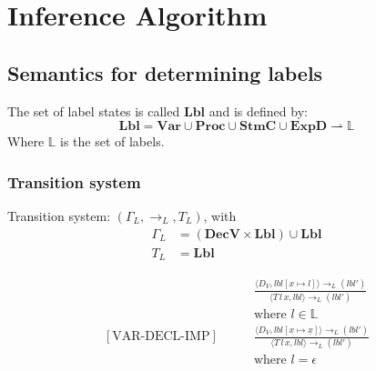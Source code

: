 
\newcommand{\iVar}{\mathbf{Var}}
\newcommand{\iProc}{\mathbf{Proc}}
\newcommand{\iDecv}{\mathbf{DecV}}
\newcommand{\iDecp}{\mathbf{DecP}}
\newcommand{\iStmc}{\mathbf{StmC}}
\newcommand{\iExpd}{\mathbf{ExpD}}
\newcommand{\iLbl}{\mathbf{Lbl}}

\newcommand{\trtspc}{\hspace{2em}} %

\section{Inference Algorithm}

\subsection{Semantics for determining labels}
The set of label states is called $\iLbl$ and is defined by:
\[
  \iLbl = \iVar \cup \iProc \cup \iStmc \cup \iExpd \rightharpoonup \mathbb{L}
\]
Where $\mathbb{L}$ is the set of labels.

\subsubsection{Transition system}
Transition system: $(\Gamma_L, \rightarrow_L, T_L)$, with
\begin{align*}
  \Gamma_L & = (\iDecv \times \iLbl) \cup \iLbl \\
  T_L & = \iLbl
\end{align*}

\begin{align*}
  [\text{VAR-DECL-EXP}] \trtspc & \frac{
    \langle D_V, lbl[x \mapsto l] \rangle \rightarrow_L (lbl')
  }{
    \langle T \, l \, x, lbl \rangle \rightarrow_L (lbl')
  }\\
  & \text{where } l \in \mathbb{L}\\[2em]
  [\text{VAR-DECL-IMP}] \trtspc & \frac{
    \langle D_V, lbl[x \mapsto \underline{x}] \rangle \rightarrow_L (lbl')
  }{
    \langle T \, l \, x, lbl \rangle \rightarrow_L (lbl')
  }\\
  & \text{where } l = \epsilon
\end{align*}


